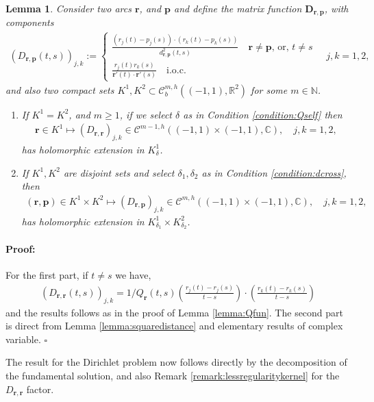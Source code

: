 \documentclass{article}
\newtheorem{lemma}[theorem]{Lemma}
\newenvironment{proof}{\paragraph{Proof:}}{\hfill$\square$}
\newcommand{\IC}{{\mathbb C}}
\newcommand{\IN}{{\mathbb N}}
\newcommand{\IR}{{\mathbb R}}
\newcommand{\bp}{{\bm p}}
\newcommand{\cmspaceh}[4]{\mathcal{C}^{#1,#2} \left( #3, #4 \right)}
\newcommand{\rgeoh}[2]{\mathcal{C}_b^{#1,#2}\left( (-1,1), \IR^2 \right)}
\newcommand{\br}{\bm{r}}
\begin{document}
\begin{lemma}
\label{lemma:Dmatrix}
Consider two arcs $\br$, and $\bp$ and define the matrix function $\mathbf{D}_{\br,\bp}$, with components
\begin{align*}
(D_{\br,\bp}(t,s))_{j,k} :=  \begin{cases}
\frac{(r_j(t)-p_j(s))\cdot (r_k(t)-p_k(s))}{d_{\br,\bp}^2(t,s)} \quad \br \neq \bp\text{, or, } t \neq s \\
\frac{r_j(t) r_k(s)}{\br'(t)\cdot \br'(s)} \quad \text{i.o.c.} 
\end{cases} \quad j,k=1,2,
\end{align*} 
and also two compact sets $K^1,K^2 \subset \rgeoh{m}{h}$ for some $m \in \IN$. 
\begin{enumerate}
\item
If $K^1 = K^2$, and $m \geq 1$, if we select $\delta$ as in Condition \ref{condition:Qself} then 
\begin{align*}
\br \in K^1 \mapsto ({D}_{\br,\br})_{j,k} \in \cmspaceh{m-1}{h}{(-1,1)\times(-1,1)}{\IC}, \quad j,k =1,2,
\end{align*} 
has holomorphic extension in $K^1_\delta$.
\item 
If $K^1, K^2$ are disjoint sets and select $\delta_1, \delta_2$ as in Condition  \ref{condition:dcross}, then 
\begin{align*}
(\br,\bp)  \in K^1 \times K^2 \mapsto ({D}_{\br,\bp})_{j,k} \in \cmspaceh{m}{h}{(-1,1)\times(-1,1)}{\IC}, \quad j,k =1,2,
\end{align*} 
has holomorphic extension in $K^1_{\delta_1} \times K^2_{\delta_2}$.
\end{enumerate}
\end{lemma} 
\begin{proof}
For the first part, if $t \neq s$ we have, 
\begin{align*}
(D_{\br,\br}(t,s))_{j,k} = 1/Q_{\br}(t,s) \left( \frac{r_j(t)-r_j(s)}{t-s} \right) \cdot \left( \frac{r_k(t)-r_k(s)}{t-s} \right)
\end{align*}
and the results follows as in the proof of Lemma \ref{lemma:Qfun}.
The second part is direct from Lemma \ref{lemma:squaredistance} and elementary results of complex variable. 
\end{proof}

The result for the Dirichlet problem now follows directly by the decomposition of the fundamental solution, and also Remark \ref{remark:lessregularitykernel} for the $D_{\br,\br}$ factor. 
\end{document}

